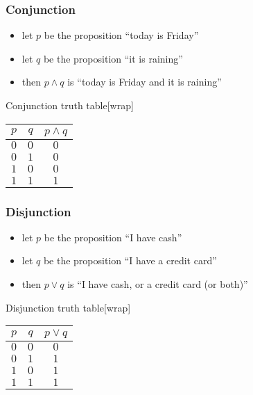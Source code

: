 \subsubsection{Conjunction}\label{ssub:conjunction}

\begin{itemize}[label={}]
    \item let \(p\) be the proposition ``today is Friday''
    \item let \(q\) be the proposition ``it is raining''
    \item then \(p \land q\) is ``today is Friday and it is raining''
\end{itemize}

\begin{highlight}{Conjunction truth table}[wrap]
    \begin{tabular}{ccc}
        \toprule
        \(p\) & \(q\) & \(p \land q\) \\
        \midrule
        \(0\) & \(0\) & \(0\)         \\
        \(0\) & \(1\) & \(0\)         \\
        \(1\) & \(0\) & \(0\)         \\
        \(1\) & \(1\) & \(1\)         \\
        \bottomrule
    \end{tabular}
\end{highlight}

\subsubsection{Disjunction}\label{ssub:disjunction}

\begin{itemize}[label={}]
    \item let \(p\) be the proposition ``I have cash''
    \item let \(q\) be the proposition ``I have a credit card''
    \item then \(p \lor q\) is ``I have cash, or a credit card (or both)''
\end{itemize}

\begin{highlight}{Disjunction truth table}[wrap]
    \begin{tabular}{ccc}
        \toprule
        \(p\) & \(q\) & \(p \lor q\) \\
        \midrule
        \(0\) & \(0\) & \(0\)        \\
        \(0\) & \(1\) & \(1\)        \\
        \(1\) & \(0\) & \(1\)        \\
        \(1\) & \(1\) & \(1\)        \\
        \bottomrule
    \end{tabular}
\end{highlight}

